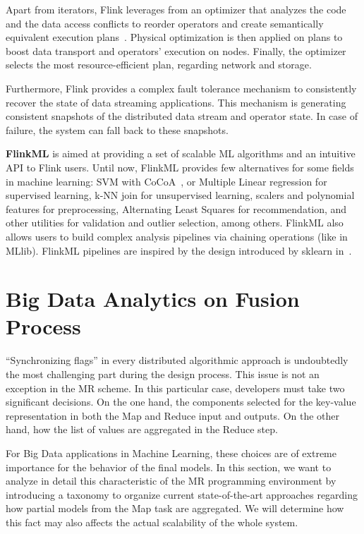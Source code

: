 \documentclass[3p,review]{elsarticle}
\begin{document}
Apart from iterators, Flink leverages from an optimizer that analyzes the code and the data access conflicts to reorder operators and create semantically equivalent execution plans~\cite{Alexandrov14,Hues12}. Physical optimization is then applied on plans to boost data transport and operators' execution on nodes. Finally, the optimizer selects the most resource-efficient plan, regarding network and storage.

Furthermore, Flink provides a complex fault tolerance mechanism to consistently recover the state of data streaming applications. This mechanism is generating consistent snapshots of the distributed data stream and operator state. In case of failure, the system can fall back to these snapshots.

\textbf{FlinkML} is aimed at providing a set of scalable ML algorithms and an intuitive API to Flink users. Until now, FlinkML provides few alternatives for some fields in machine learning: SVM with CoCoA~\cite{jaggi14}, or Multiple Linear regression for supervised learning, k-NN join for unsupervised learning, scalers and polynomial features for preprocessing, Alternating Least Squares for recommendation, and other utilities for validation and outlier selection, among others. FlinkML also allows users to build complex analysis pipelines via chaining operations (like in MLlib). FlinkML pipelines are inspired by the design introduced by sklearn in~\cite{buitin13}.

\section{Big Data Analytics on Fusion Process}\label{sec:fusion}

``Synchronizing flags'' in every distributed algorithmic approach is undoubtedly the most challenging part during the design process. This issue is not an exception in the MR scheme. In this particular case, developers must take two significant decisions. On the one hand, the components selected for the key-value representation in both the Map and Reduce input and outputs. On the other hand, how the list of values are aggregated in the Reduce step. 

For Big Data applications in Machine Learning, these choices are of extreme importance for the behavior of the final models. In this section, we want to analyze in detail this characteristic of the MR programming environment by introducing a taxonomy to organize current state-of-the-art approaches regarding how partial models from the Map task are aggregated. We will determine how this fact may also affects the actual scalability of the whole system. 
\end{document}
